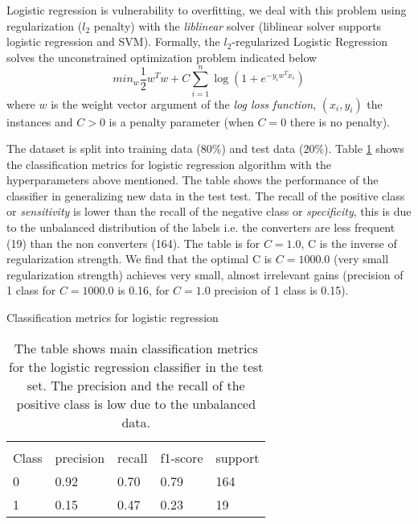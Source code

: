 \documentclass[11pt]{article}
\theoremstyle{definition}
\theoremstyle{remark}
\begin{document}
Logistic regression is vulnerability to overfitting, we deal with this problem using regularization ($l_2$ penalty) with the  \emph{liblinear} solver (liblinear solver supports logistic regression and SVM). 
Formally, the $l_2$-regularized Logistic Regression solves the unconstrained optimization problem indicated below \cite{fan2008liblinear}
\begin{equation}
\textit{min}_{w} \frac{1}{2}w^Tw + C \sum_{i=1}^{n}\log(1+ e^{-y_iw^Tx_i})
\end{equation}
where $w$ is the weight vector argument of the \emph{log loss function}, $(x_i,y_i)$ the instances and $C > 0$ is a penalty parameter (when $C=0$ there is no penalty).

The dataset is split into training data ($80\%$) and test data ($20\%$). Table \ref{tab:logreg} shows the classification metrics for logistic regression algorithm with the hyperparameters above mentioned. The table shows the performance of the classifier in generalizing new data in the test test. 
The recall of the positive class or \emph{sensitivity} is lower than the recall of the negative class or \emph{specificity}, this is due to the unbalanced distribution of the labels i.e. the converters are less frequent (19) than the non converters (164). The table is for $C = 1.0$, C is the inverse of regularization strength. We find that the optimal C is $C = 1000.0$ (very small regularization strength) achieves very small, almost irrelevant gains (precision of 1 class for $C = 1000.0$ is 0.16, for $C = 1.0$ precision of 1 class is 0.15). 

\begin{table}[H]
\caption{Classification metrics for logistic regression} \label{tab:logreg} 
\begin{center} 
\begin{tabular}{lllll}
\hline
\multicolumn{1}{c}{} \\
Class & precision & recall & f1-score & support     \\
\hline
0 & 0.92  &    0.70   &   0.79   &    164 \\
1 & 0.15  &    0.47   &   0.23   &     19 \\
\hline
\end{tabular}
\caption{The table shows main classification metrics for the logistic regression classifier in the test set. The precision and the recall of the positive class is low due to the unbalanced data.}
\end{center}
\end{table}
\end{document}
